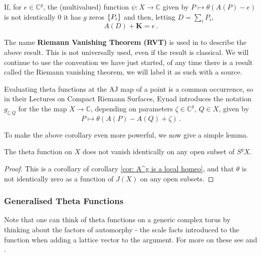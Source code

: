 \documentclass{article}
\begin{document}
\begin{corollary}\label{cor: RVT from ES, A(D)+K=e}
	If, for $e \in \mathbb{C}^g$, the (multivalued) function $\psi: X \to \mathbb{C}$ given by $P \mapsto \theta(A(P)-e)$ is not identically $0$ it has $g$ zeros $\left\{ P_i \right\}$ and then, letting $D=\sum_i P_i$,
	\[
	A(D)+\bm{K} = e \, .
	\]
\end{corollary}
\begin{remark}
	The name \textbf{Riemann Vanishing Theorem (RVT)} is used in \cite{Ercolani1989} to describe the above result. This is not universally used, even if the result is classical. We will continue to use the convention we have just started, of any time there is a result called the Riemann vanishing theorem, we will label it as such with a source. 
\end{remark}
\begin{remark}
	Evaluating theta functions at the AJ map of a point is a common occurrence, so in their Lectures on Compact Riemann Surfaces, Eynad introduces the notation $g_{\zeta, Q}$ for the the map $X \to \mathbb{C}$, depending on parameters $\zeta \in \mathbb{C}^g, \, Q \in X$, given by 
	\[
	P \mapsto \theta(A(P)-A(Q)+\zeta) \, .
	\]
\end{remark}

To make the above corollary even more powerful, we now give a simple lemma.
\begin{lemma}
	The theta function on $X$ does not vanish identically on any open subset of $S^gX$.
\end{lemma}
\begin{proof}
	This is a corollary of corollary \ref{cor: A^g is a local homeo}, and that $\theta$ is not identically zero as a function of $J(X)$ on any open subsets. 
\end{proof}

\subsubsection{Generalised Theta Functions}
Note that one can think of theta functions on a generic complex torus by thinking about the factors of automorphy - the scale facts introduced to the function when adding a lattice vector to the argument. For more on these see \cite{Birkenhake2004} and \cite{Beauville2011}.

\end{document}
